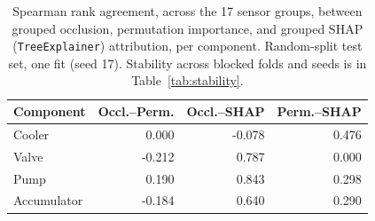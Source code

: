 \begin{table}[t]
\centering
\caption{Spearman rank agreement, across the 17 sensor groups, between grouped occlusion, permutation importance, and grouped SHAP (\texttt{TreeExplainer}) attribution, per component. Random-split test set, one fit (seed 17). Stability across blocked folds and seeds is in Table~\ref{tab:stability}.}
\label{tab:explainagree}
\footnotesize
\setlength{\tabcolsep}{4pt}
\begin{tabular}{lrrr}
\hline
Component & Occl.--Perm. & Occl.--SHAP & Perm.--SHAP \\
\hline
Cooler & 0.000 & -0.078 & 0.476 \\
Valve & -0.212 & 0.787 & 0.000 \\
Pump & 0.190 & 0.843 & 0.298 \\
Accumulator & -0.184 & 0.640 & 0.290 \\
\hline
\end{tabular}
\end{table}
